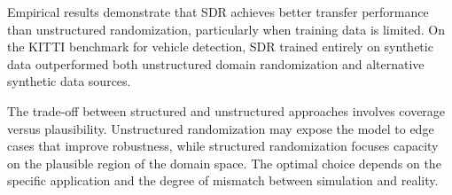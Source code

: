 Empirical results demonstrate that SDR achieves better transfer performance than unstructured randomization, particularly when training data is limited. On the KITTI benchmark for vehicle detection, SDR trained entirely on synthetic data outperformed both unstructured domain randomization and alternative synthetic data sources.

The trade-off between structured and unstructured approaches involves coverage versus plausibility. Unstructured randomization may expose the model to edge cases that improve robustness, while structured randomization focuses capacity on the plausible region of the domain space. The optimal choice depends on the specific application and the degree of mismatch between simulation and reality.

\begin{figure}[htbp]
\centering
{}
\end{figure}
